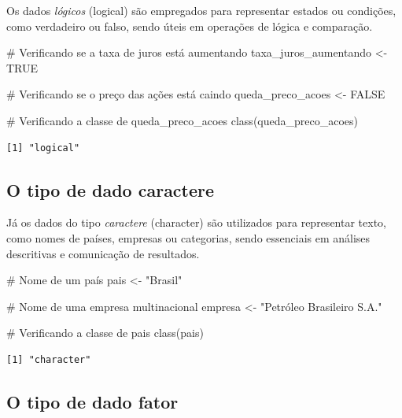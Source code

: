 \documentclass[
  letterpaper,
  DIV=11,
  numbers=noendperiod]{scrreprt}
\newenvironment{Shaded}{\begin{snugshade}}{\end{snugshade}}
\newcommand{\CommentTok}[1]{\textcolor[rgb]{0.37,0.37,0.37}{#1}}
\newcommand{\ConstantTok}[1]{\textcolor[rgb]{0.56,0.35,0.01}{#1}}
\newcommand{\FunctionTok}[1]{\textcolor[rgb]{0.28,0.35,0.67}{#1}}
\newcommand{\NormalTok}[1]{\textcolor[rgb]{0.00,0.23,0.31}{#1}}
\newcommand{\OtherTok}[1]{\textcolor[rgb]{0.00,0.23,0.31}{#1}}
\newcommand{\StringTok}[1]{\textcolor[rgb]{0.13,0.47,0.30}{#1}}
\begin{document}
Os dados \emph{lógicos} (logical) são empregados para representar
estados ou condições, como verdadeiro ou falso, sendo úteis em operações
de lógica e comparação.

\begin{Shaded}
\begin{Highlighting}[]
\CommentTok{\# Verificando se a taxa de juros está aumentando}
\NormalTok{taxa\_juros\_aumentando }\OtherTok{\textless{}{-}} \ConstantTok{TRUE}

\CommentTok{\# Verificando se o preço das ações está caindo}
\NormalTok{queda\_preco\_acoes }\OtherTok{\textless{}{-}} \ConstantTok{FALSE}

\CommentTok{\# Verificando a classe de queda\_preco\_acoes}
\FunctionTok{class}\NormalTok{(queda\_preco\_acoes)}
\end{Highlighting}
\end{Shaded}

\begin{verbatim}
[1] "logical"
\end{verbatim}

\hypertarget{o-tipo-de-dado-caractere}{%
\subsection{O tipo de dado caractere}\label{o-tipo-de-dado-caractere}}

Já os dados do tipo \emph{caractere} (character) são utilizados para
representar texto, como nomes de países, empresas ou categorias, sendo
essenciais em análises descritivas e comunicação de resultados.

\begin{Shaded}
\begin{Highlighting}[]
\CommentTok{\# Nome de um país}
\NormalTok{pais }\OtherTok{\textless{}{-}} \StringTok{"Brasil"}

\CommentTok{\# Nome de uma empresa multinacional}
\NormalTok{empresa }\OtherTok{\textless{}{-}} \StringTok{"Petróleo Brasileiro S.A."}

\CommentTok{\# Verificando a classe de pais}
\FunctionTok{class}\NormalTok{(pais)}
\end{Highlighting}
\end{Shaded}

\begin{verbatim}
[1] "character"
\end{verbatim}

\hypertarget{o-tipo-de-dado-fator}{%
\subsection{O tipo de dado fator}\label{o-tipo-de-dado-fator}}
\end{document}
